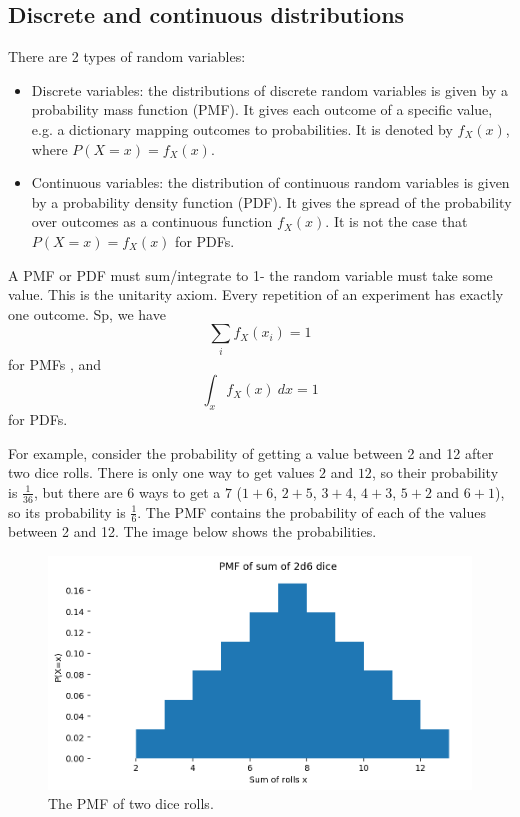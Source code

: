 \documentclass[a4paper, openany]{memoir}
\begin{document}
\subsection{Discrete and continuous distributions}
There are 2 types of random variables:
\begin{itemize}
    \item Discrete variables: the distributions of discrete random variables is given by a probability mass function (PMF). It gives each outcome of a specific value, e.g. a dictionary mapping outcomes to probabilities. It is denoted by $f_X(x)$, where $P(X = x) = f_X(x)$.
    \item Continuous variables: the distribution of continuous random variables is given by a probability density function (PDF). It gives the spread of the probability over outcomes as a continuous function $f_X(x)$. It is not the case that $P(X = x) = f_X(x)$ for PDFs.
\end{itemize}

A PMF or PDF must sum/integrate to 1- the random variable must take some value. This is the unitarity axiom. Every repetition of an experiment has exactly one outcome. Sp, we have
\[\sum_i f_X(x_i) = 1\]
for PMFs , and
\[\int_x f_X(x) \ dx = 1\]
for PDFs.

For example, consider the probability of getting a value between 2 and 12 after two dice rolls. There is only one way to get values $2$ and $12$, so their probability is $\frac{1}{36}$, but there are 6 ways to get a $7$ ($1 + 6$, $2 + 5$, $3 + 4$, $4 + 3$, $5 + 2$ and $6 + 1$), so its probability is $\frac{1}{6}$. The PMF contains the probability of each of the values between 2 and 12. The image below shows the probabilities.
\begin{figure}[H]
    \centering
    \includegraphics[scale=0.6]{src/5.1 pmf of sum 2d6 dice.png}
    \caption{The PMF of two dice rolls.}
\end{figure}
\end{document}

